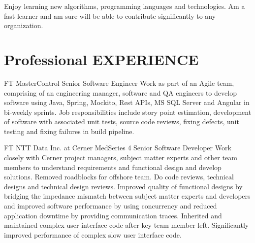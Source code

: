 \documentclass[10pt]{article} %
\begin{document}
\begin{paracol}{2}
Enjoy learning new algorithms, programming languages and technologies. Am a fast learner and am sure will be able to contribute significantly to any organization. 
\medskip %



\section{Professional EXPERIENCE}




{FT} %
{MasterControl} %
{Senior Software Engineer} %
{Work as part of an Agile team, comprising of an engineering manager, software and QA engineers to develop software using Java, Spring, Mockito, Rest APIs, MS SQL Server and Angular in bi-weekly sprints. Job responsibilities include story point estimation, development of software with associated unit tests, source code reviews, fixing defects, unit testing and fixing failures in build pipeline. } %

{FT} %
{NTT Data Inc. at Cerner MedSeries 4} %
{Senior Software Developer} %
{Work closely with Cerner project managers, subject matter experts and other team members to understand requirements and functional design and develop solutions. Removed roadblocks for offshore team. Do code reviews, technical designs and technical design reviews. Improved quality of functional designs by bridging the impedance mismatch between subject matter experts and developers and improved software performance by using concurrency and reduced application downtime by providing communication traces. Inherited and maintained complex user interface code after key team member left. Significantly improved performance of complex slow user interface code.} %



\end{paracol}
\end{document}
